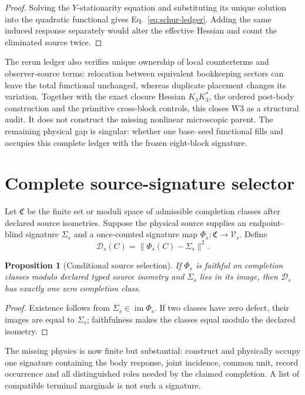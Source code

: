 \documentclass[11pt]{article}
\newtheorem{proposition}{Proposition}
\begin{document}
\begin{proof}
Solving the \(Y\)-stationarity equation and substituting its unique solution
into the quadratic functional gives Eq.~\eqref{eq:schur-ledger}. Adding the
same induced response separately would alter the effective Hessian and count
the eliminated source twice.
\end{proof}

The rerun ledger also verifies unique ownership of local counterterms and
observer-source terms: relocation between equivalent bookkeeping sectors can
leave the total functional unchanged, whereas duplicate placement changes its
variation. Together with the exact closure Hessian \(K_3K_3^*\), the ordered
post-body construction and the primitive cross-block controls, this closes W3
as a structural audit. It does not construct the missing nonlinear
microscopic parent. The remaining physical gap is singular: whether one
base--seed functional fills and occupies this complete ledger with the frozen
eight-block signature.

\section{Complete source-signature selector}

Let \(\mathfrak C\) be the finite set or moduli space of admissible completion
classes after declared source isometries.  Suppose the physical source supplies
an endpoint-blind signature \(\Sigma_s\) and a once-counted signature map
\(\Phi_s:\mathfrak C\to\mathcal V_s\).  Define
\begin{equation}
 \mathcal D_s(C)=\lVert\Phi_s(C)-\Sigma_s\rVert^2.
 \label{eq:source-defect}
\end{equation}

\begin{proposition}[Conditional source selection]
If \(\Phi_s\) is faithful on completion classes modulo declared typed source
isometry and \(\Sigma_s\) lies in its image, then
\(\mathcal D_s\) has exactly one zero completion class.
\end{proposition}

\begin{proof}
Existence follows from \(\Sigma_s\in\operatorname{im}\Phi_s\).  If two classes
have zero defect, their images are equal to \(\Sigma_s\); faithfulness makes
the classes equal modulo the declared isometry.
\end{proof}

The missing physics is now finite but substantial: construct and physically
occupy one signature containing the body response, joint incidence, common
unit, record occurrence and all distinguished roles needed by the claimed
completion.  A list of compatible terminal marginals is not such a signature.
\end{document}
